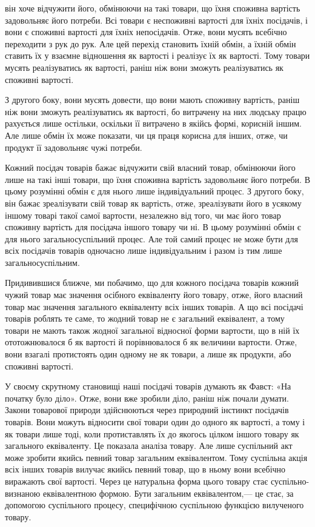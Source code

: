 \parcont{}  %
він хоче відчужити його, обмінюючи на такі товари, що їхня
споживна вартість задовольняє його потреби. Всі товари є неспоживні
вартості для їхніх посідачів, і вони є споживні вартості
для їхніх непосідачів. Отже, вони мусять всебічно переходити
з рук до рук. Але цей перехід становить їхній обмін, а їхній обмін
ставить їх у взаємне відношення як вартості і реалізує їх як
вартості. Тому товари мусять реалізуватись як вартості, раніш
ніж вони зможуть реалізуватись як споживні вартості.

З    другого боку, вони мусять довести, що вони мають споживну
вартість, раніш ніж вони зможуть реалізуватись як вартості,
бо витрачену на них людську працю рахується лише остільки,
оскільки її витрачено в якійсь формі, корисній іншим. Але лише
обмін їх може показати, чи ця праця корисна для інших, отже,
чи продукт її задовольняє чужі потреби.

Кожний посідач товарів бажає відчужити свій власний товар,
обмінюючи його лише на такі інші товари, що їхня споживна
вартість задовольняє його потреби. В цьому розумінні обмін
є для нього лише індивідуальний процес. З другого боку, він
бажає зреалізувати свій товар як вартість, отже, зреалізувати
його в усякому іншому товарі такої самої вартости, незалежно
від того, чи має його товар споживну вартість для посідача іншого
товару чи ні. В цьому розумінні обмін є для нього загальносуспільний
процес. Але той самий процес не може бути для всіх
посідачів товарів одночасно лише індивідуальним і разом із тим
лише загальносуспільним.

Придивившися ближче, ми побачимо, що для кожного посідача
товарів кожний чужий товар має значення осібного еквіваленту
його товару, отже, його власний товар має значення
загального еквіваленту всіх інших товарів. А що всі посідачі
товарів роблять те саме, то жодний товар не є загальний еквівалент,
а тому товари не мають також жодної загальної відносної
форми вартости, що в ній їх ототожнювалося б як вартості й
порівнювалося б як величини вартости. Отже, вони взагалі
протистоять один одному не як товари, а лише як продукти, або
споживні вартості.

У своєму скрутному становищі наші посідачі товарів думають
як Фавст: «На початку було діло». Отже, вони вже зробили
діло, раніш ніж почали думати. Закони товарової природи здійснюються
через природний інстинкт посідачів товарів. Вони можуть
відносити свої товари один до одного як вартості, а тому
і як товари лише тоді, коли протиставлять їх до якогось цілком
іншого товару як загального еквіваленту. Це показала аналіза
товару. Але лише суспільний акт може зробити якийсь певний
товар загальним еквівалентом. Тому суспільна акція всіх інших
товарів вилучає якийсь певний товар, що в ньому вони всебічно
виражають свої вартості. Через це натуральна форма цього
товару стає суспільно-визнаною еквівалентною формою. Бути
загальним еквівалентом,— це стає, за допомогою суспільного
процесу, специфічною суспільною функцією вилученого товару.
\parbreak{}  %
